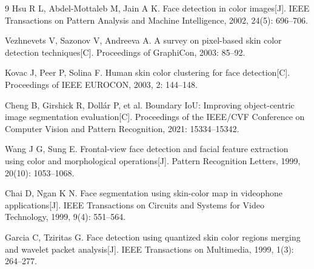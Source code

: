 \documentclass{SYSUReport}
\begin{document}
\begin{thebibliography}{9}
Hsu R L, Abdel-Mottaleb M, Jain A K.
Face detection in color images[J].
IEEE Transactions on Pattern Analysis and Machine Intelligence, 2002, 24(5): 696--706.

Vezhnevets V, Sazonov V, Andreeva A.
A survey on pixel-based skin color detection techniques[C].
Proceedings of GraphiCon, 2003: 85--92.

Kovac J, Peer P, Solina F.
Human skin color clustering for face detection[C].
Proceedings of IEEE EUROCON, 2003, 2: 144--148.

Cheng B, Girshick R, Doll\'{a}r P, et al.
Boundary IoU: Improving object-centric image segmentation evaluation[C].
Proceedings of the IEEE/CVF Conference on Computer Vision and Pattern Recognition, 2021: 15334--15342.

Wang J G, Sung E.
Frontal-view face detection and facial feature extraction using color and morphological operations[J].
Pattern Recognition Letters, 1999, 20(10): 1053--1068.

Chai D, Ngan K N.
Face segmentation using skin-color map in videophone applications[J].
IEEE Transactions on Circuits and Systems for Video Technology, 1999, 9(4): 551--564.

Garcia C, Tziritas G.
Face detection using quantized skin color regions merging and wavelet packet analysis[J].
IEEE Transactions on Multimedia, 1999, 1(3): 264--277.
\end{thebibliography}
\end{document}
